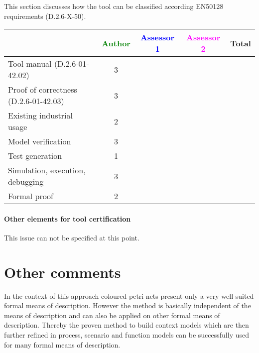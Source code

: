 This section discusses how the tool can be classified according EN50128 requirements (D.2.6-X-50).


\begin{tabular}{|l | c | c | c | c|}
\hline
& \textcolor{green}{Author} & \textcolor{blue}{Assessor 1} & \textcolor{magenta}{Assessor 2} & Total \\
\hline 
Tool manual (D.2.6-01-42.02) & 3 & & &  \\
\hline
Proof of correctness (D.2.6-01-42.03)   & 3  & & & \\
\hline
Existing industrial  usage  & 2 & & & \\
\hline
Model verification & 3 & & & \\
\hline
Test generation & 1 & & & \\
\hline
Simulation, execution, debugging & 3 & & & \\
\hline
Formal proof & 2 & & & \\
\hline
\end{tabular}


\paragraph{Other elements for tool certification}
This issue can not be specified at this point.


\section{Other comments}
In the context of this approach coloured petri nets present only a very well suited formal means of description. However the method is basically independent of the means of description and can also be applied on other formal means of description. Thereby the proven method to build context models which are then further refined in process, scenario and function models can be successfully used for many formal means of description. 



